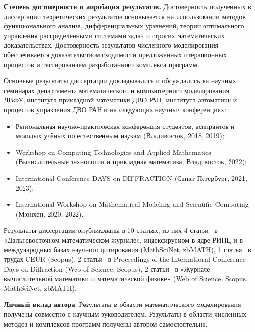     \textbf{Степень достоверности и апробация результатов.}
    Достоверность полученных в диссертации теоретических результатов основывается на
    использовании методов функционального анализа, дифференциальных
    уравнений, теории оптимального управления распределенными системами
    задач и строгих математических доказательствах.
    Достоверность результатов численного моделирования обеспечивается
    доказательством сходимости предложенных итерационных процессов
    и тестированием разработанного комплекса программ.

    Основные результаты диссертации докладывались и обсуждались на
    научных семинарах департамента математического и компьютерного моделирования
    ДВФУ, института прикладной математики ДВО РАН, института автоматики
    и процессов управления ДВО РАН и на следующих научных конференциях:
    \begin{itemize}[leftmargin=5.5mm]
        \item Региональная научно-практическая конференция студентов, аспирантов
        и молодых учёных по естественным наукам (Владивосток, 2018, 2019);
        \item Workshop on Computing Technologies and Applied Mathematics
        (Вычислительные технологии и прикладная математика, Владивосток, 2022);
        \item International Conference DAYS on DIFFRACTION (Санкт-Петербург, 2021, 2023);
        \item International Workshop on Mathematical Modeling and Scientific Computing (Мюнхен, 2020, 2022).
    \end{itemize}

    {\publications}
    Результаты диссертации опубликованы в 10 статьях, из них 4
    статьи~\cite{mesenev_23_opt, mesenev_22_penalty, mesenev_20_alg, mesenev_18_boundary}
    в «Дальневосточном математическом журнале», индексируемом
    в ядре РИНЦ и в международных базах научного цитирования (MathSciNet,
    zbMATH), 1 статья~\cite{mesenev_20_opt_proc} в трудах CEUR (Scopus),
    2 статьи~\cite{mesenev_21_optimal_proc, mesenev_23_inv_proc}
    в Proceedings of the International Conference Days on Diffraction (Web of Science, Scopus),
    2 статьи~\cite{mesenev_23_problem, Mesenev_22_analysis}
    в «Журнале вычислительной математики и математической физике»
    (Web of Science, Scopus, MathSciNet, zbMATH).

    \textbf{Личный вклад автора.}
    Результаты в области математического моделирования получены совместно с научным руководителем.
    Результаты в области численных методов и комплексов программ получены автором самостоятельно.
